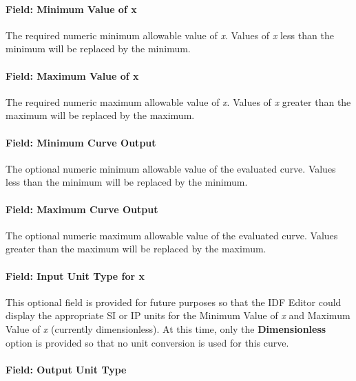 \paragraph{Field: Minimum Value of x}\label{field-minimum-value-of-x-16}

The required numeric minimum allowable value of \emph{x}. Values of \emph{x} less than the minimum will be replaced by the minimum.

\paragraph{Field: Maximum Value of x}\label{field-maximum-value-of-x-17}

The required numeric maximum allowable value of \emph{x}. Values of \emph{x} greater than the maximum will be replaced by the maximum.

\paragraph{Field: Minimum Curve Output}\label{field-minimum-curve-output-16}

The optional numeric minimum allowable value of the evaluated curve. Values less than the minimum will be replaced by the minimum.

\paragraph{Field: Maximum Curve Output}\label{field-maximum-curve-output-15}

The optional numeric maximum allowable value of the evaluated curve. Values greater than the maximum will be replaced by the maximum.

\paragraph{Field: Input Unit Type for x}\label{field-input-unit-type-for-x-16}

This optional field is provided for future purposes so that the IDF Editor could display the appropriate SI or IP units for the Minimum Value of \emph{x} and Maximum Value of \emph{x} (currently dimensionless). At this time, only the \textbf{Dimensionless} option is provided so that no unit conversion is used for this curve.

\paragraph{Field: Output Unit Type}\label{field-output-unit-type-15}

